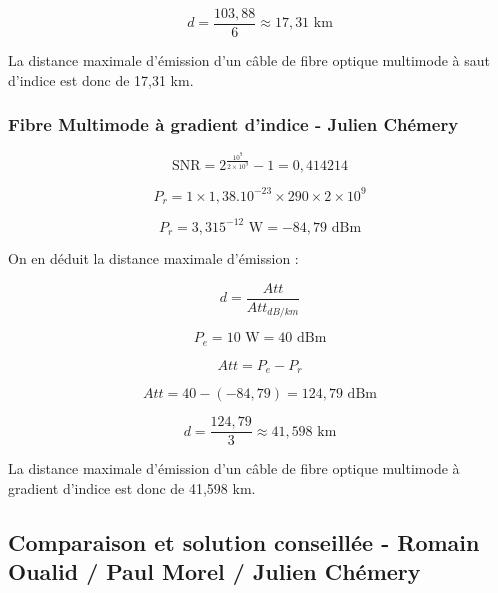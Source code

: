 \documentclass[12]{article}
\begin{document}
\begin{equation*}
    d = \frac{103,88}{6} \approx 17,31 \text{ km}
\end{equation*}

La distance maximale d'émission d'un câble de fibre optique multimode à saut d'indice est donc de 17,31 km.


\subsubsection{Fibre Multimode à gradient d'indice - Julien Chémery}


\begin{equation*}
    \text{SNR} = 2^{ \frac{10^9}{2 \times 10^{9}}} -1 = 0,414214
\end{equation*}

\begin{equation*}
    P_r = 1 \times 1,38.10^{-23} \times 290 \times 2 \times 10^{9}
\end{equation*}

\begin{equation*}
    P_r = 3,315^{-12} \text{ W} = -84,79 \text{ dBm}
\end{equation*}

On en déduit la distance maximale d'émission : 

\begin{equation*}
    d = \frac{Att}{Att_{dB/km}}
\end{equation*}

\begin{equation*}
    P_e = 10 \text{ W} = 40 \text{ dBm}
\end{equation*}

\begin{equation*}
    Att = P_e - P_r
\end{equation*}
    
\begin{equation*}
    Att = 40 - \left( -84,79 \right) = 124,79 \text{ dBm}
\end{equation*}

\begin{equation*}
    d = \frac{124,79}{3} \approx 41,598 \text{ km}
\end{equation*}

La distance maximale d'émission d'un câble de fibre optique multimode à gradient d'indice est donc de 41,598 km.

\newpage
\subsection{Comparaison et solution conseillée - Romain Oualid / Paul Morel / Julien Chémery}
\end{document}
